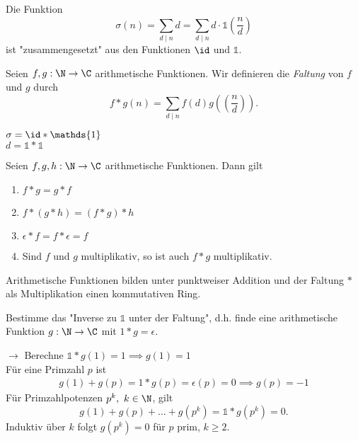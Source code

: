 \begin{obs*}
	Die Funktion
	\[ \sigma(n) = \sum_{d \mid n} d = \sum_{d \mid n} d \cdot \mathds{1} \left(\frac{n}{d}\right) \]
	ist "zusammengesetzt" aus den Funktionen $\id$ und $\mathds{1}$.
\end{obs*}

\begin{defn*}[Faltung]
	Seien $f,g: \N \to \C$ arithmetische Funktionen. Wir definieren die \emph{Faltung} von $f$ und $g$ durch
	\[ f * g(n) = \sum_{d \mid n} f(d) g(\left(\frac{n}{d}\right)). \]
\end{defn*}

\begin{exmp*}
	$\sigma = \id * \mathds{1}$\\$d = \mathds{1} * \mathds{1}$
\end{exmp*}

\begin{lem}\autolabel
	Seien $f,g,h: \N\to \C$ arithmetische Funktionen. Dann gilt
	\begin{enumerate}[label={\roman*})]
		\item $f * g = g * f$
		\item $f*(g*h) = (f*g)*h$
		\item $\epsilon * f = f * \epsilon = f$
		\item Sind $f$ und $g$ multiplikativ, so ist auch $f*g$ multiplikativ.
	\end{enumerate}
\end{lem}

\begin{rem*}
	Arithmetische Funktionen bilden unter punktweiser Addition und der Faltung $*$ als Multiplikation einen kommutativen Ring.
\end{rem*}

\begin{frage*}
	Bestimme das "Inverse zu $\mathds{1}$ unter der Faltung", d.h. finde eine arithmetische Funktion $g: \N \to \C$ mit $1 * g = \epsilon$.
\end{frage*}

$\to$ Berechne $\mathds{1} * g(1) = 1 \implies g(1) = 1$\\
Für eine Primzahl $p$ ist
\begin{align*}
	g(1) + g(p) = 1 * g(p) = \epsilon(p) = 0 \implies g(p) = -1
\end{align*}
Für Primzahlpotenzen $p^k,\ k \in \N$, gilt
\[ g(1) + g(p) + \dots + g(p^k) = \mathds{1} * g(p^k) = 0. \]
Induktiv über $k$ folgt $g(p^k)=0$ für $p$ prim, $k\geq 2$.

